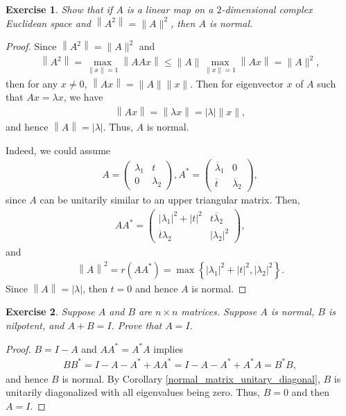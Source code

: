 \documentclass[10pt]{book}
\newtheorem{exercise}{Exercise}[section]
\theoremstyle{definition}
\numberwithin{equation}{chapter}
\begin{document}
\begin{exercise}
Show that if $A$ is a linear map on a $2$-dimensional complex Euclidean space and $\left\|A^2\right\| = \|A\|^2$, then $A$ is normal.
\end{exercise}
\begin{proof}
Since $\left\|A^2\right\| = \|A\|^2$ and
\begin{align*}
    \left\|A^2\right\| = \max_{\|x\| = 1} \left\|AAx\right\| \leq \|A\| \max_{\|x\| = 1} \left\|Ax\right\| = \|A\|^2,
\end{align*}
then for any $x \neq 0$, $\left\|Ax\right\| = \|A\| \|x\|$. Then for eigenvector $x$ of $A$ such that $Ax = \lambda x$, we have
\begin{align*}
    \left\|Ax\right\| = \left\|\lambda x\right\| = |\lambda| \|x\|,
\end{align*}
and hence $\left\|A\right\| = |\lambda|$. Thus, $A$ is normal.

Indeed, we could assume
\begin{align*}
    A = \begin{pmatrix}
        \lambda_1 & t \\
        0 & \lambda_2
    \end{pmatrix},
    A^* = \begin{pmatrix}
        \overline{\lambda}_1 & 0 \\
        \overline{t} & \overline{\lambda}_2
    \end{pmatrix},
\end{align*}
since $A$ can be unitarily similar to an upper triangular matrix. Then,
\begin{align*}
    A A^* = \begin{pmatrix}
        \left|\lambda_1\right|^2 + |t|^2 & t \overline{\lambda}_2 \\
        \overline{t} \lambda_2 & \left|\lambda_2\right|^2
    \end{pmatrix},
\end{align*}
and 
\begin{align*}
    \left\|A\right\|^2 = r\left(A A^*\right) = \max \left\{ \left|\lambda_1\right|^2 + |t|^2, \left|\lambda_2\right|^2 \right\}.
\end{align*}
Since $\left\|A\right\| = |\lambda|$, then $t = 0$ and hence $A$ is normal.
\end{proof}

\medskip

\begin{exercise}
Suppose $A$ and $B$ are $n \times n$ matrices. Suppose $A$ is normal, $B$ is nilpotent, and $A + B = I$. Prove that $A = I$.
\end{exercise}
\begin{proof}
$B = I - A$ and $A A^* = A^* A$ implies
\begin{align*}
    BB^* = I - A - A^* + A A^* = I - A - A^* + A^* A = B^*B,
\end{align*}
and hence $B$ is normal. By Corollary \ref{normal_matrix_unitary_diagonal}, $B$ is unitarily diagonalized with all eigenvalues being zero. Thus, $B = 0$ and then $A = I$.
\end{proof}
\end{document}
